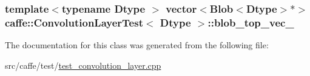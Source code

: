 \hypertarget{classcaffe_1_1_convolution_layer_test_a0e6a300a7bd189e09a979d3889b6c6ca}{
\subsubsection[{blob\+\_\+top\+\_\+vec\+\_\+}]{\setlength{\rightskip}{0pt plus 5cm}template$<$typename Dtype $>$ vector$<${\bf Blob}$<$Dtype$>$$\ast$$>$ {\bf caffe\+::\+Convolution\+Layer\+Test}$<$ Dtype $>$\+::blob\+\_\+top\+\_\+vec\+\_\+\hspace{0.3cm}{\ttfamily [protected]}}}\label{classcaffe_1_1_convolution_layer_test_a0e6a300a7bd189e09a979d3889b6c6ca}


The documentation for this class was generated from the following file\+:\begin{DoxyCompactItemize}
\item 
src/caffe/test/\hyperlink{test__convolution__layer_8cpp}{test\+\_\+convolution\+\_\+layer.\+cpp}\end{DoxyCompactItemize}
